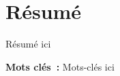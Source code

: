 \chapter*{Résumé} 


Résumé ici

\begin{singlespace}
\textbf{Mots clés~:} Mots-clés ici
\end{singlespace}